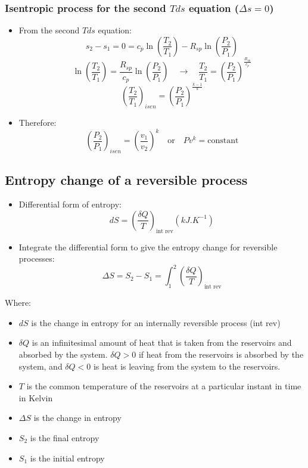 \documentclass[11pt]{article}
\begin{document}
\subsubsection{Isentropic process for the second \(Tds\) equation (\(\Delta s = 0\))}
\label{sec:org34ad353}
\begin{itemize}
\item From the second \(Tds\) equation:
\[s_2 - s_1 = 0 = c_p \ln \left( \frac{T_2}{T_1} \right) - R_{sp} \ln \left( \frac{P_2}{P_1} \right)\]
\[\ln \left(\frac{T_2}{T_1} \right) = \frac{R_{sp}}{c_p} \ln \left( \frac{P_2}{P_1} \right) \quad \rightarrow \quad \frac{T_2}{T_1} = \left(\frac{P_2}{P_1} \right)^{\frac{R_{sp}}{c_p}}\]
\[\left( \frac{T_2}{T_1} \right)_{isen} = \left(\frac{P_2}{P_1} \right)^{\frac{k - 1}{k}}\]

\item Therefore:
\[\left(\frac{P_2}{P_1} \right)_{isen} = \left(\frac{v_1}{v_2} \right)^k \quad \text{or} \quad Pv^k = \text{constant}\]
\end{itemize}

 \newpage

\subsection{Entropy change of a reversible process}
\label{sec:orgb9455ed}
\begin{itemize}
\item Differential form of entropy:
\[dS = \left( \frac{\delta Q}{T} \right)_{\text{int rev}} \left(\unit{kJ.K^{-1}} \right)\]
\item Integrate the differential form to give the entropy change for reversible processes:
\[\Delta S = S_2 - S_1 = \int_1^2 \left(\frac{\delta Q}{T} \right)_{\text{int rev}}\]
\end{itemize}

Where:
\begin{itemize}
\item \(dS\) is the change in entropy for an internally reversible process (int rev)
\item \(\delta Q\) is an infinitesimal amount of heat that is taken from the reservoirs and absorbed by the system. \(\delta Q > 0\) if heat from the reservoirs is absorbed by the system, and \(\delta Q < 0\) is heat is leaving from the system to the reservoirs.
\item \(T\) is the common temperature of the reservoirs at a particular instant in time in Kelvin
\item \(\Delta S\) is the change in entropy
\item \(S_2\) is the final entropy
\item \(S_1\) is the initial entropy
\end{itemize}
\end{document}

